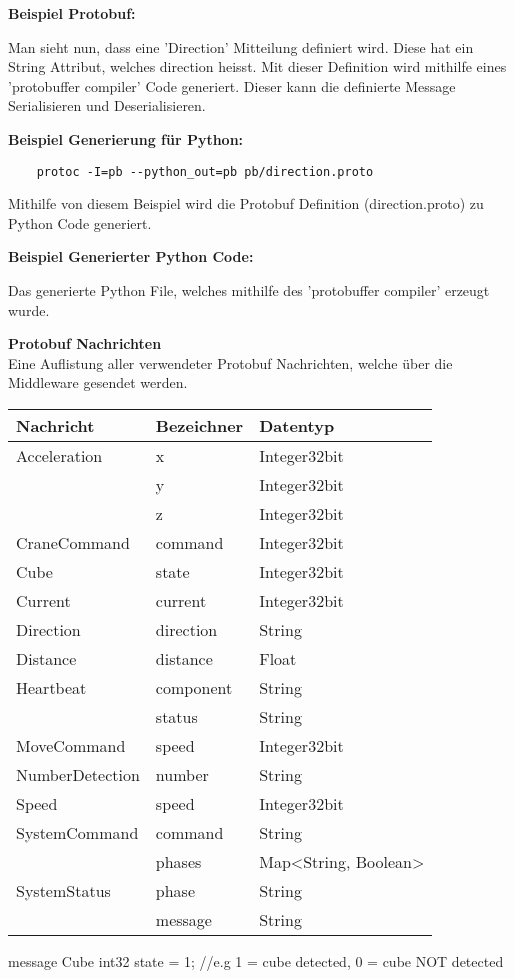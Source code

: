 \documentclass[../../main.tex]{subfiles}
\begin{document}
\textbf{Beispiel Protobuf:}

Man sieht nun, dass eine 'Direction' Mitteilung definiert wird. Diese hat ein String Attribut, welches direction heisst. Mit dieser Definition wird mithilfe eines 'protobuffer compiler' Code generiert. Dieser kann die definierte Message Serialisieren und Deserialisieren.

\textbf{Beispiel Generierung für Python:}
\begin{lstlisting}
    protoc -I=pb --python_out=pb pb/direction.proto
\end{lstlisting}
Mithilfe von diesem Beispiel wird die Protobuf Definition (direction.proto) zu Python Code generiert.

\textbf{Beispiel Generierter Python Code:}

Das generierte Python File, welches mithilfe des 'protobuffer compiler' erzeugt wurde.

\textbf{Protobuf Nachrichten} \\
Eine Auflistung aller verwendeter Protobuf Nachrichten, welche über die Middleware gesendet werden.
\begin{table}[H]
  \begin{tabular}{lll}
  \hline
  \textbf{Nachricht} & \textbf{Bezeichner} & \textbf{Datentyp} \\ \hline
  Acceleration & x & Integer32bit \\ 
   & y & Integer32bit \\
   & z & Integer32bit \\ \hline
  CraneCommand & command & Integer32bit\\ \hline
  Cube & state & Integer32bit\\ \hline
  Current & current & Integer32bit\\ \hline
  Direction & direction & String\\ \hline
  Distance & distance & Float\\ \hline
  Heartbeat & component & String\\ 
   & status & String\\ \hline
  MoveCommand & speed & Integer32bit\\ \hline
  NumberDetection & number & String\\ \hline
  Speed & speed & Integer32bit\\ \hline
  SystemCommand & command & String\\
   & phases & Map<String, Boolean>\\ \hline
  SystemStatus & phase & String\\
   & message & String\\ \hline
  \end{tabular}
\end{table}
message Cube {
    int32 state = 1; //e.g 1 = cube detected, 0 = cube NOT detected
}
\end{document}
